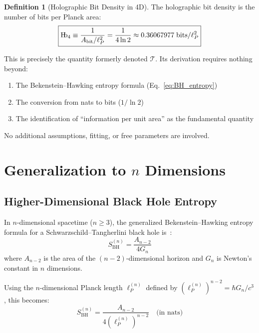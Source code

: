 \documentclass[11pt,a4paper]{article}
\theoremstyle{plain}
\theoremstyle{definition}
\newtheorem{definition}[theorem]{Definition}
\newcommand{\Hb}{\textnormal{H\kern-0.3em b}}
\newcommand{\Hbfour}{\Hb_4}
\newcommand{\Tc}{\mathcal{T}}
\newcommand{\lp}{\ell_P}
\begin{document}
\begin{definition}[Holographic Bit Density in 4D]
\label{def:Hb4}
The holographic bit density is the number of bits per Planck area:
\begin{equation}
\boxed{\Hbfour \equiv \frac{1}{A_{\text{bit}}/\lp^2} = \frac{1}{4\ln 2} \approx 0.36067977 \; \text{bits}/\lp^2}
\label{eq:Hb4}
\end{equation}
\end{definition}

This is precisely the quantity formerly denoted $\Tc$. Its derivation requires nothing beyond:
\begin{enumerate}[nosep]
    \item The Bekenstein--Hawking entropy formula (Eq.~\ref{eq:BH_entropy})
    \item The conversion from nats to bits ($1/\ln 2$)
    \item The identification of ``information per unit area'' as the fundamental quantity
\end{enumerate}

No additional assumptions, fitting, or free parameters are involved.

\section{Generalization to $n$ Dimensions}
\label{sec:generalization}

\subsection{Higher-Dimensional Black Hole Entropy}

In $n$-dimensional spacetime ($n \geq 3$), the generalized Bekenstein--Hawking entropy formula for a Schwarzschild--Tangherlini black hole is~\cite{Myers1986}:
\begin{equation}
S_{\text{BH}}^{(n)} = \frac{A_{n-2}}{4 G_n}
\label{eq:BH_n}
\end{equation}
where $A_{n-2}$ is the area of the $(n-2)$-dimensional horizon and $G_n$ is Newton's constant in $n$ dimensions.

Using the $n$-dimensional Planck length $\lp^{(n)}$ defined by $(\lp^{(n)})^{n-2} = \hbar G_n / c^3$, this becomes:
\begin{equation}
S_{\text{BH}}^{(n)} = \frac{A_{n-2}}{4 (\lp^{(n)})^{n-2}} \quad \text{(in nats)}
\end{equation}
\end{document}
